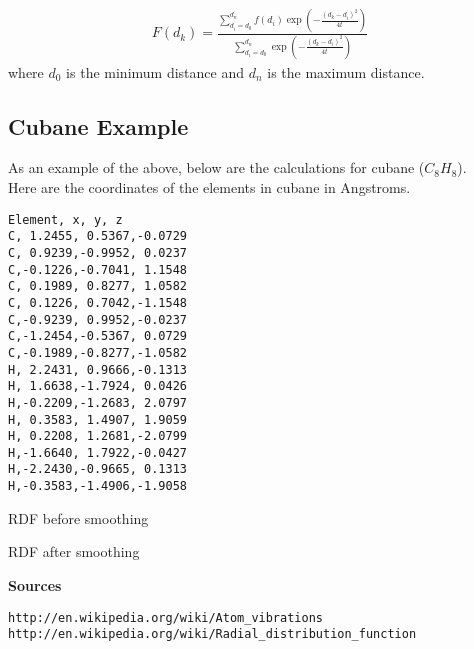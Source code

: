 \documentclass[12pt,letterpaper]{article}
\begin{document}
\begin{align*}
  F(d_k) = \frac{\sum_{d_i = d_0}^{d_n} f(d_i) \exp\left(-\frac{(d_k -
                  d_i)^2}{4t}\right)}
            {\sum_{d_i = d_0}^{d_n} \exp\left(-\frac{(d_k - d_i)^2}{4t}\right)}
\end{align*}
where $d_0$ is the minimum distance and $d_n$ is the maximum distance.

\subsection{Cubane Example}
As an example of the above, below are the calculations for cubane ($C_8 H_8$).\\

\noindent Here are the coordinates of the elements in cubane in Angstroms.

\begin{verbatim}
Element, x, y, z
C, 1.2455, 0.5367,-0.0729
C, 0.9239,-0.9952, 0.0237
C,-0.1226,-0.7041, 1.1548
C, 0.1989, 0.8277, 1.0582
C, 0.1226, 0.7042,-1.1548
C,-0.9239, 0.9952,-0.0237
C,-1.2454,-0.5367, 0.0729
C,-0.1989,-0.8277,-1.0582
H, 2.2431, 0.9666,-0.1313
H, 1.6638,-1.7924, 0.0426
H,-0.2209,-1.2683, 2.0797
H, 0.3583, 1.4907, 1.9059
H, 0.2208, 1.2681,-2.0799
H,-1.6640, 1.7922,-0.0427
H,-2.2430,-0.9665, 0.1313
H,-0.3583,-1.4906,-1.9058
\end{verbatim}

RDF before smoothing

RDF after smoothing

\noindent \textbf{Sources}
\begin{verbatim}
http://en.wikipedia.org/wiki/Atom_vibrations
http://en.wikipedia.org/wiki/Radial_distribution_function
\end{verbatim}

\end{document}
